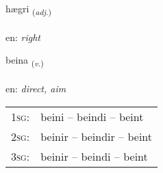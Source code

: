 \documentclass[frontgrid, backgrid]{flacards}\usepackage[]{graphicx}\usepackage[]{color}
\begin{document}
\renewcommand{\flhead}{\vskip5pt \fboxsep=0pt {\small\bfseries\footnotesize Lýsingarorð | Adjective}}
\renewcommand{\fcfoot}{\vskip5pt \fboxsep=0pt \hspace{2pt}{\small\bfseries\footnotesize 2K}}

\renewcommand{\blhead}{\vskip5pt {\small\bfseries\footnotesize Lýsingarorð | Adjective }}
\renewcommand{\bcfoot}{\vskip5pt \hspace{2pt}{\small\bfseries\footnotesize 2K}}


{hægri \small{\textsubscript{(\textit{adj.})}} \\[1ex] %
\textphonetic{[haiɣrɪ]} \\
en: \emph{right} \\  [2ex]
\renewcommand*{\arraystretch}{0.8}
}

\renewcommand{\flhead}{\vskip5pt \fboxsep=0pt {\small\bfseries\footnotesize Sagnorð | Verb}}
\renewcommand{\fcfoot}{\vskip5pt \fboxsep=0pt \hspace{2pt}{\small\bfseries\footnotesize 2K}}

\renewcommand{\blhead}{\vskip5pt {\small\bfseries\footnotesize Sagnorð | Verb }}
\renewcommand{\bcfoot}{\vskip5pt \hspace{2pt}{\small\bfseries\footnotesize 2K}}


{beina \small{\textsubscript{(\textit{v.})}} \\[1ex] %
\textphonetic{[peiːna]} \\
en: \emph{direct, aim} \\  [2ex]
\renewcommand*{\arraystretch}{0.8}
\begin{tabular}{p{1cm}l}
\textsc{1sg}: & beini -- beindi -- beint \\ 
\textsc{2sg}: & beinir -- beindir -- beint \\ 
\textsc{3sg}: & beinir -- beindi -- beint \\ 
\end{tabular}
}
\end{document}
